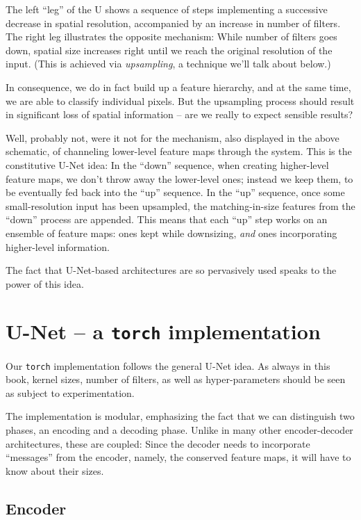 \documentclass[
  letterpaper,
]{krantz}
\begin{document}
The left ``leg'' of the U shows a sequence of steps implementing a
successive decrease in spatial resolution, accompanied by an increase in
number of filters. The right leg illustrates the opposite mechanism:
While number of filters goes down, spatial size increases right until we
reach the original resolution of the input. (This is achieved via
\emph{upsampling}, a technique we'll talk about below.)

In consequence, we do in fact build up a feature hierarchy, and at the
same time, we are able to classify individual pixels. But the upsampling
process should result in significant loss of spatial information -- are
we really to expect sensible results?

Well, probably not, were it not for the mechanism, also displayed in the
above schematic, of channeling lower-level feature maps through the
system. This is the constitutive U-Net idea: In the ``down'' sequence,
when creating higher-level feature maps, we don't throw away the
lower-level ones; instead we keep them, to be eventually fed back into
the ``up'' sequence. In the ``up'' sequence, once some small-resolution
input has been upsampled, the matching-in-size features from the
``down'' process are appended. This means that each ``up'' step works on
an ensemble of feature maps: ones kept while downsizing, \emph{and} ones
incorporating higher-level information.

The fact that U-Net-based architectures are so pervasively used speaks
to the power of this idea.

\hypertarget{u-net-a-torch-implementation}{%
\section{\texorpdfstring{U-Net -- a \texttt{torch}
implementation}{U-Net -- a torch implementation}}\label{u-net-a-torch-implementation}}

Our \texttt{torch} implementation follows the general U-Net idea. As
always in this book, kernel sizes, number of filters, as well as
hyper-parameters should be seen as subject to experimentation.

The implementation is modular, emphasizing the fact that we can
distinguish two phases, an encoding and a decoding phase. Unlike in many
other encoder-decoder architectures, these are coupled: Since the
decoder needs to incorporate ``messages'' from the encoder, namely, the
conserved feature maps, it will have to know about their sizes.

\hypertarget{encoder}{%
\subsection{Encoder}\label{encoder}}
\end{document}

